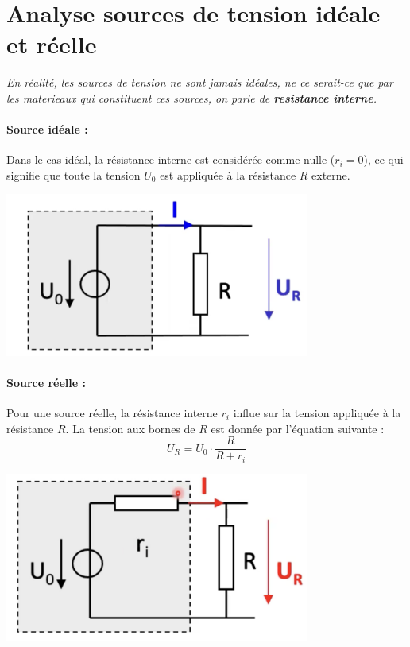 \section{Analyse sources de tension idéale et réelle}
\textit{En réalité, les sources de tension ne sont jamais idéales, ne ce serait-ce que par les materieaux qui constituent ces sources, on parle de \textbf{resistance interne}.} \\
\vspace{10px}
\begin{minipage}[htp]{0.45\textwidth}
    \paragraph{Source idéale :}
    Dans le cas idéal, la résistance interne est considérée comme nulle ($r_i = 0$), ce qui signifie que toute la tension $U_0$ est appliquée à la résistance $R$ externe.
    \vfill
    \begin{center}
        \includegraphics[width=0.75\textwidth]{chapters/chapter1/images/ideal.png}
    \end{center}
\end{minipage}
\hfill
\vline
\hfill
\begin{minipage}[htp]{0.45\textwidth}
\paragraph{Source réelle :}
Pour une source réelle, la résistance interne $r_i$ influe sur la tension appliquée à la résistance $R$. La tension aux bornes de $R$ est donnée par l'équation suivante :
\[
U_R = U_0 \cdot \frac{R}{R + r_i}
\]
\vfill
\begin{center}
    \includegraphics[width=0.75\textwidth]{chapters/chapter1/images/reel.png}
\end{center}
\end{minipage}
